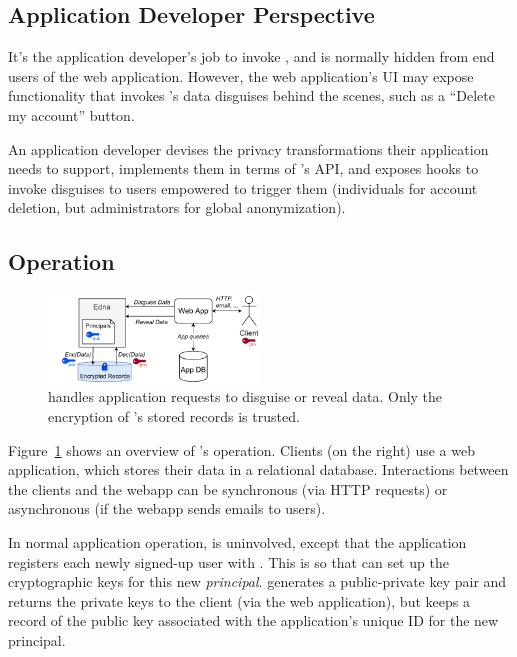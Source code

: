 \subsection{Application Developer Perspective}
%
It's the application developer's job to invoke \sys, and \sys is normally
hidden from end users of the web application.
%
However, the web application's UI may expose functionality that invokes \sys's
data disguises behind the scenes, such as a ``Delete my account'' button.
%

%
An application developer devises the privacy transformations their application needs to
support, implements them in terms of \sys's API, and exposes hooks to invoke disguises to
users empowered to trigger them (\eg individuals for account deletion, but
administrators for global anonymization).
%

\subsection{\sys Operation}

\begin{figure}[t]
  \centering
    \includegraphics[width=0.5\textwidth]{figs/edna_arch}
  \caption{\sys handles application requests to disguise or reveal data. Only the
    encryption of \sys's stored records is trusted.}
  \label{f:edna-overview}
\end{figure}

%
Figure~\ref{f:edna-overview} shows an overview of \sys's operation.
%
Clients (on the right) use a web application, which stores their data in a
relational database.
%
Interactions between the clients and the webapp can be synchronous (via HTTP
requests) or asynchronous (\eg if the webapp sends emails to users).
%

%
In normal application operation, \sys is uninvolved, except that the application
registers each newly signed-up user with \sys.
%
This is so that \sys can set up the cryptographic keys for this new \emph{principal}.
%
\sys generates a public-private key pair and returns the private keys to the
client (via the web application), but keeps a record of the public key associated
with the application's unique ID for the new principal.
%

